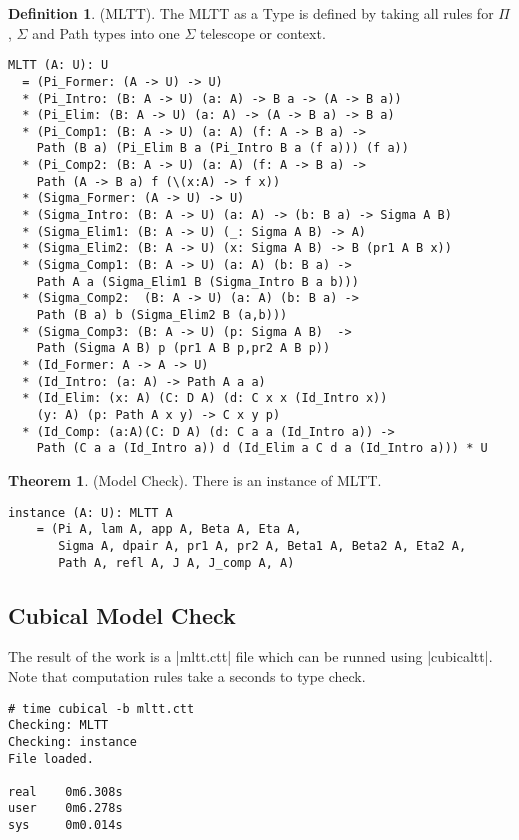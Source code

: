 \documentclass[twoside]{article}
\theoremstyle{definition}
\newtheorem{theorem}{Theorem}
\newtheorem{definition}{Definition}
\begin{document}
\begin{definition} (MLTT).
The MLTT as a Type is defined by taking all rules
for $\Pi$, $\Sigma$ and Path types into one $\Sigma$ telescope or context.
\begin{lstlisting}[mathescape=true]
MLTT (A: U): U
  = (Pi_Former: (A -> U) -> U)
  * (Pi_Intro: (B: A -> U) (a: A) -> B a -> (A -> B a))
  * (Pi_Elim: (B: A -> U) (a: A) -> (A -> B a) -> B a)
  * (Pi_Comp1: (B: A -> U) (a: A) (f: A -> B a) ->
    Path (B a) (Pi_Elim B a (Pi_Intro B a (f a))) (f a))
  * (Pi_Comp2: (B: A -> U) (a: A) (f: A -> B a) ->
    Path (A -> B a) f (\(x:A) -> f x))
  * (Sigma_Former: (A -> U) -> U)
  * (Sigma_Intro: (B: A -> U) (a: A) -> (b: B a) -> Sigma A B)
  * (Sigma_Elim1: (B: A -> U) (_: Sigma A B) -> A)
  * (Sigma_Elim2: (B: A -> U) (x: Sigma A B) -> B (pr1 A B x))
  * (Sigma_Comp1: (B: A -> U) (a: A) (b: B a) ->
    Path A a (Sigma_Elim1 B (Sigma_Intro B a b)))
  * (Sigma_Comp2:  (B: A -> U) (a: A) (b: B a) ->
    Path (B a) b (Sigma_Elim2 B (a,b)))
  * (Sigma_Comp3: (B: A -> U) (p: Sigma A B)  ->
    Path (Sigma A B) p (pr1 A B p,pr2 A B p))
  * (Id_Former: A -> A -> U)
  * (Id_Intro: (a: A) -> Path A a a)
  * (Id_Elim: (x: A) (C: D A) (d: C x x (Id_Intro x))
    (y: A) (p: Path A x y) -> C x y p)
  * (Id_Comp: (a:A)(C: D A) (d: C a a (Id_Intro a)) ->
    Path (C a a (Id_Intro a)) d (Id_Elim a C d a (Id_Intro a))) * U
\end{lstlisting}
\end{definition}

\begin{theorem} (Model Check).
There is an instance of MLTT.
\begin{lstlisting}
instance (A: U): MLTT A
    = (Pi A, lam A, app A, Beta A, Eta A,
       Sigma A, dpair A, pr1 A, pr2 A, Beta1 A, Beta2 A, Eta2 A,
       Path A, refl A, J A, J_comp A, A)
\end{lstlisting}
\end{theorem}

\subsection*{Cubical Model Check}

The result of the work is a |mltt.ctt| file which can be runned using |cubicaltt|.
Note that computation rules take a seconds to type check.

\begin{lstlisting}
# time cubical -b mltt.ctt
Checking: MLTT
Checking: instance
File loaded.

real    0m6.308s
user    0m6.278s
sys     0m0.014s
\end{lstlisting}
\end{document}
